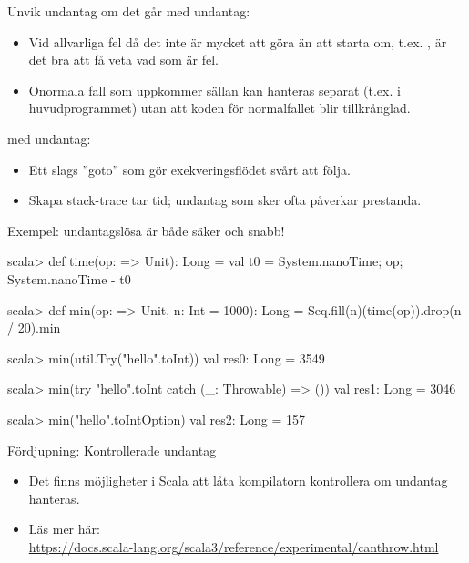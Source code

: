 \begin{Slide}{Unvik undantag om det går}
\SlideFontSmall
{} med undantag: 
\begin{itemize}
\item Vid allvarliga fel då det inte är mycket att göra än att starta om, t.ex. , är det bra att få veta vad som är fel.
\item Onormala fall som uppkommer sällan kan hanteras separat (t.ex. i huvudprogrammet) utan att koden för normalfallet blir tillkrånglad. 
\end{itemize}
 med undantag: 
\begin{itemize}
\item Ett slags ''goto'' som gör exekveringsflödet svårt att följa.
\item Skapa stack-trace tar tid; undantag som sker ofta påverkar prestanda.
\end{itemize}
\pause Exempel: undantagslösa  är både säker och snabb!
\begin{REPLsmall}
scala> def time(op: => Unit): Long = {val t0 = System.nanoTime; op; System.nanoTime - t0}

scala> def min(op: => Unit, n: Int = 1000): Long = Seq.fill(n)(time(op)).drop(n / 20).min

scala> min(util.Try("hello".toInt))
val res0: Long = 3549

scala> min(try "hello".toInt catch (_: Throwable) => ())
val res1: Long = 3046

scala> min("hello".toIntOption)
val res2: Long = 157
\end{REPLsmall}
\end{Slide}

\begin{Slide}{Fördjupning: Kontrollerade undantag}
\begin{itemize}
\item Det finns möjligheter i Scala att låta kompilatorn kontrollera om undantag hanteras.
\item Läs mer här: \\ \url{https://docs.scala-lang.org/scala3/reference/experimental/canthrow.html}
\end{itemize}
  
\end{Slide}
